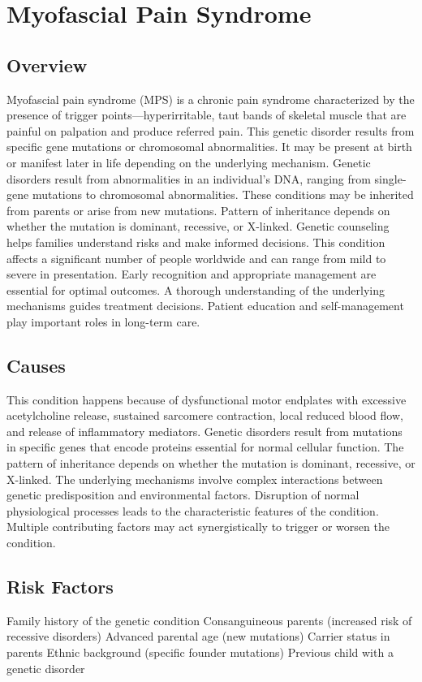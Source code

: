 \chapter{Myofascial Pain Syndrome}
\label{sec:Myofascial Pain Syndrome}

\section{Overview}
Myofascial pain syndrome (MPS) is a chronic pain syndrome characterized by the presence of trigger points---hyperirritable, taut bands of skeletal muscle that are painful on palpation and produce referred pain. This genetic disorder results from specific gene mutations or chromosomal abnormalities. It may be present at birth or manifest later in life depending on the underlying mechanism. Genetic disorders result from abnormalities in an individual's DNA, ranging from single-gene mutations to chromosomal abnormalities. These conditions may be inherited from parents or arise from new mutations. Pattern of inheritance depends on whether the mutation is dominant, recessive, or X-linked. Genetic counseling helps families understand risks and make informed decisions. This condition affects a significant number of people worldwide and can range from mild to severe in presentation. Early recognition and appropriate management are essential for optimal outcomes. A thorough understanding of the underlying mechanisms guides treatment decisions. Patient education and self-management play important roles in long-term care.
\section{Causes}
This condition happens because of dysfunctional motor endplates with excessive acetylcholine release, sustained sarcomere contraction, local reduced blood flow, and release of inflammatory mediators. Genetic disorders result from mutations in specific genes that encode proteins essential for normal cellular function. The pattern of inheritance depends on whether the mutation is dominant, recessive, or X-linked. The underlying mechanisms involve complex interactions between genetic predisposition and environmental factors. Disruption of normal physiological processes leads to the characteristic features of the condition. Multiple contributing factors may act synergistically to trigger or worsen the condition.
\section{Risk Factors}
Family history of the genetic condition Consanguineous parents (increased risk of recessive disorders) Advanced parental age (new mutations) Carrier status in parents Ethnic background (specific founder mutations) Previous child with a genetic disorder


